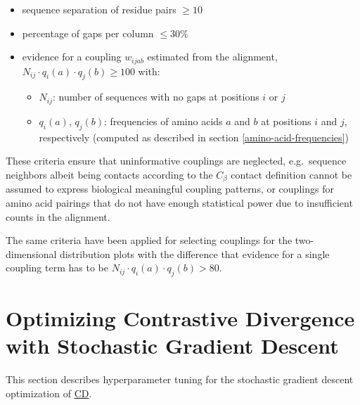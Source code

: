 \documentclass[11pt,a4paper,twoside]{book}
\providecommand{\tightlist}{%
  \setlength{\itemsep}{0pt}\setlength{\parskip}{0pt}}
\newcommand{\Cb}{C_\beta}
\newcommand{\wijab}{w_{ijab}}
\theoremstyle{definition}
\theoremstyle{definition}
\theoremstyle{remark}
\begin{document}
\begin{itemize}
\tightlist
\item
  sequence separation of residue pairs \(\ge 10\)
\item
  percentage of gaps per column \(\le 30\%\)
\item
  evidence for a coupling \(\wijab\) estimated from the alignment,
  \(N_{ij} \cdot q_i(a) \cdot q_j(b) \ge 100\) with:

  \begin{itemize}
  \tightlist
  \item
    \(N_{ij}\): number of sequences with no gaps at positions \(i\) or
    \(j\)
  \item
    \(q_i(a)\), \(q_j(b)\): frequencies of amino acids \(a\) and \(b\)
    at positions \(i\) and \(j\), respectively (computed as described in
    section \ref{amino-acid-frequencies})
  \end{itemize}
\end{itemize}

These criteria ensure that uninformative couplings are neglected,
e.g.~sequence neighbors albeit being contacts according to the \(\Cb\)
contact definition cannot be assumed to express biological meaningful
coupling patterns, or couplings for amino acid pairings that do not have
enough statistical power due to insufficient counts in the alignment.

The same criteria have been applied for selecting couplings for the
two-dimensional distribution plots with the difference that evidence for
a single coupling term has to be
\(N_{ij} \cdot q_i(a) \cdot q_j(b) > 80.\)

\section{Optimizing Contrastive Divergence with Stochastic Gradient
Descent}\label{methods-sgd}

This section describes hyperparameter tuning for the stochastic gradient
descent optimization of \protect\hyperlink{abbrev}{CD}.
\end{document}
